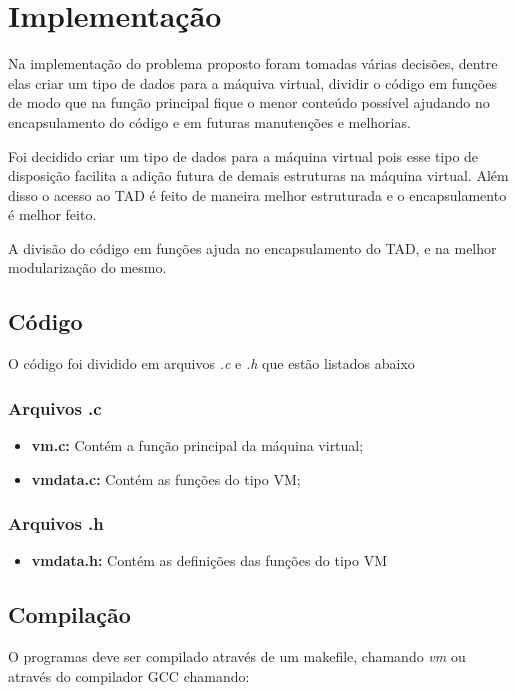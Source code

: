 \documentclass[12pt]{article}
\begin{document}
\section{Implementação}
\label{implementacao}
Na implementação do problema proposto foram tomadas várias decisões, dentre
elas criar um tipo de dados para a máquiva virtual, dividir o código em funções
de modo que na função principal fique o menor conteúdo possível ajudando no
encapsulamento do código e em futuras manutenções e melhorias.

Foi decidido criar um tipo de dados para a máquina virtual pois esse tipo de
disposição facilita a adição futura de demais estruturas na máquina virtual.
Além disso o acesso ao TAD é feito de maneira melhor estruturada e o
encapsulamento é melhor feito.

A divisão do código em funções ajuda no encapsulamento do TAD, e na melhor
modularização do mesmo.

\subsection{Código}
O código foi dividido em arquivos \textit{.c} e \textit{.h} que estão listados
abaixo

\subsubsection{Arquivos .c}
\begin{itemize}
\item \textbf{vm.c:} Contém a função principal da máquina virtual;
\item \textbf{vmdata.c:} Contém as funções do tipo VM;
\end{itemize}

\subsubsection{Arquivos .h}

\begin{itemize}
\item \textbf{vmdata.h:} Contém as definições das funções do tipo VM
\end{itemize}

\subsection{Compilação}

O programas deve ser compilado através de um makefile, chamando \textit{vm}
ou através do compilador GCC chamando:\\
\end{document}
